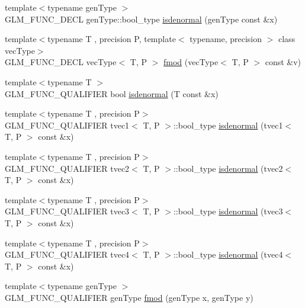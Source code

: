 \begin{DoxyCompactItemize}
\item 
{\footnotesize template$<$typename gen\+Type $>$ }\\G\+L\+M\+\_\+\+F\+U\+N\+C\+\_\+\+D\+E\+C\+L gen\+Type\+::bool\+\_\+type \hyperlink{group__gtx__common_ga74aa7c7462245d83bd5a9edf9c6c2d91}{isdenormal} (gen\+Type const \&x)
\item 
{\footnotesize template$<$typename T , precision P, template$<$ typename, precision $>$ class vec\+Type$>$ }\\G\+L\+M\+\_\+\+F\+U\+N\+C\+\_\+\+D\+E\+C\+L vec\+Type$<$ T, P $>$ \hyperlink{group__gtx__common_ga2580f50d4064557d62f4a533dfc6c7e3}{fmod} (vec\+Type$<$ T, P $>$ const \&v)
\item 
{\footnotesize template$<$typename T $>$ }\\G\+L\+M\+\_\+\+F\+U\+N\+C\+\_\+\+Q\+U\+A\+L\+I\+F\+I\+E\+R bool \hyperlink{namespaceglm_ae1eb587972c0a1c492f6c7026e34ca4f}{isdenormal} (T const \&x)
\item 
{\footnotesize template$<$typename T , precision P$>$ }\\G\+L\+M\+\_\+\+F\+U\+N\+C\+\_\+\+Q\+U\+A\+L\+I\+F\+I\+E\+R tvec1$<$ T, P $>$\+::bool\+\_\+type \hyperlink{namespaceglm_aa92fc157ce32f36f5046a1fe9cbf06a6}{isdenormal} (tvec1$<$ T, P $>$ const \&x)
\item 
{\footnotesize template$<$typename T , precision P$>$ }\\G\+L\+M\+\_\+\+F\+U\+N\+C\+\_\+\+Q\+U\+A\+L\+I\+F\+I\+E\+R tvec2$<$ T, P $>$\+::bool\+\_\+type \hyperlink{namespaceglm_ac32f35a22d48d844fdb5818a969a813e}{isdenormal} (tvec2$<$ T, P $>$ const \&x)
\item 
{\footnotesize template$<$typename T , precision P$>$ }\\G\+L\+M\+\_\+\+F\+U\+N\+C\+\_\+\+Q\+U\+A\+L\+I\+F\+I\+E\+R tvec3$<$ T, P $>$\+::bool\+\_\+type \hyperlink{namespaceglm_adbc1b50d093dfcbd800c1d317f798599}{isdenormal} (tvec3$<$ T, P $>$ const \&x)
\item 
{\footnotesize template$<$typename T , precision P$>$ }\\G\+L\+M\+\_\+\+F\+U\+N\+C\+\_\+\+Q\+U\+A\+L\+I\+F\+I\+E\+R tvec4$<$ T, P $>$\+::bool\+\_\+type \hyperlink{namespaceglm_a0807268548a810387d609bdd544ed7e9}{isdenormal} (tvec4$<$ T, P $>$ const \&x)
\item 
{\footnotesize template$<$typename gen\+Type $>$ }\\G\+L\+M\+\_\+\+F\+U\+N\+C\+\_\+\+Q\+U\+A\+L\+I\+F\+I\+E\+R gen\+Type \hyperlink{namespaceglm_a823bda2877e4dcc4440987f94e0e3690}{fmod} (gen\+Type x, gen\+Type y)

\end{DoxyCompactItemize}
